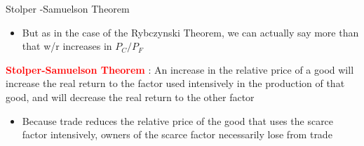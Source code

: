 \documentclass[10pt,hyperref={CJKbookmarks=true},xcolor=dvipsnames,aspectratio=169]{beamer}
\begin{document}
\begin{frame}{Stolper -Samuelson Theorem }

\begin{itemize}
\item But as in the case of the Rybczynski Theorem, we can actually say
more than that w/r increases in $P_{C}/P_{F}$ \end{itemize}
\begin{theorem}
\textbf{\textcolor{red}{Stolper-Samuelson Theorem}} : An increase
in the relative price of a good will increase the real return to the
factor used intensively in the production of that good, and will decrease
the real return to the other factor\end{theorem}

\begin{itemize}
\item Because trade reduces the relative price of the good that uses the
scarce factor intensively, owners of the scarce factor necessarily
lose from trade 
\end{itemize}
\end{frame}
\end{document}
